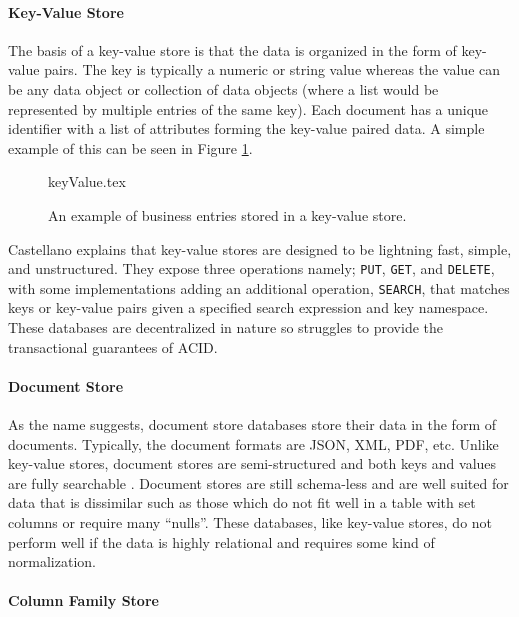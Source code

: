\paragraph{Key-Value Store}

The basis of a key-value store is that the data is organized in the form of key-value pairs. The key is typically a numeric or string value whereas the value can be any data object or collection of data objects (where a list would be represented by multiple entries of the same key). Each document has a unique identifier with a list of attributes forming the key-value paired data. A simple example of this can be seen in Figure \ref{fig:keyvalue}.

\begin{figure}[ht]
    \small
    \centering
    {keyValue.tex}
    \vspace*{5mm}
    \caption{An example of business entries stored in a key-value store.}
    \label{fig:keyvalue}
\end{figure}

Castellano \cite{keyvalueArticle} explains that key-value stores are designed to be lightning fast, simple, and unstructured. They expose three operations namely; \verb|PUT|, \verb|GET|, and \verb|DELETE|, with some implementations adding an additional operation, \verb|SEARCH|, that matches keys or key-value pairs given a specified search expression and key namespace. These databases are decentralized in nature so struggles to provide the transactional guarantees of ACID.

\paragraph{Document Store}

As the name suggests, document store databases store their data in the form of documents. Typically, the document formats are JSON, XML, PDF, etc. Unlike key-value stores, document stores are semi-structured and both keys and values are fully searchable \cite{nosqlDb}. Document stores are still schema-less and are well suited for data that is dissimilar such as those which do not fit well in a table with set columns \cite{docstoreArticle} or require many ``nulls''. These databases, like key-value stores, do not perform well if the data is highly relational and requires some kind of normalization.

\paragraph{Column Family Store}

